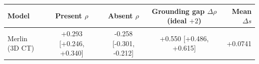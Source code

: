 \begin{tabular}{lcccr}
\toprule
Model & Present $\rho$ & Absent $\rho$ & Grounding gap $\Delta\rho$ (ideal $+2$) & Mean $\Delta s$ \\
\midrule
Merlin (3D CT) & +0.293 [+0.246, +0.340] & -0.258 [-0.301, -0.212] & +0.550 [+0.486, +0.615] & +0.0741 \\
\bottomrule
\end{tabular}

